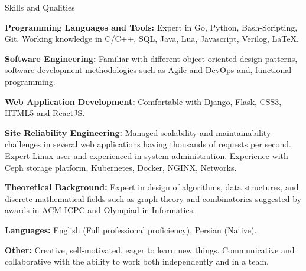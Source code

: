\documentclass{resume} %
\begin{document}
\begin{rSection}{Skills and Qualities}

	{\bf Programming Languages and Tools:}
	Expert in Go, Python, Bash-Scripting, Git. Working knowledge in C/C++, SQL, Java, Lua, Javascript, Verilog, \LaTeX.

	{\bf Software Engineering:}
	Familiar with different object-oriented design patterns, software development methodologies such as Agile and DevOps and, functional programming.

	{\bf Web Application Development:}
	Comfortable with Django, Flask, CSS3, HTML5 and ReactJS.

	{\bf Site Reliability Engineering:}
	Managed scalability and maintainability challenges in several web applications having thousands of requests per second.
	Expert Linux user and experienced in system administration.
	Experience with Ceph storage platform, Kubernetes, Docker, NGINX, Networks.

	{\bf Theoretical Background:}
	Expert in design of algorithms, data structures, and discrete mathematical fields such as graph theory and combinatorics suggested by awards in ACM ICPC and Olympiad in Informatics.

	{\bf Languages:}
	English (Full professional proficiency), Persian (Native).

	{\bf Other:}
	Creative, self-motivated, eager to learn new things. Communicative and collaborative with the ability to work both independently and in a team.

\end{rSection}
	
\end{document}
